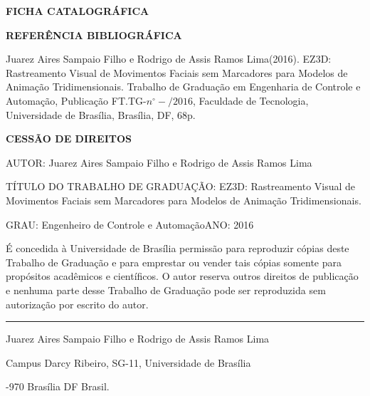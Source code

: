 \noindent \textbf{FICHA CATALOGRÁFICA}

\noindent %

\noindent \medskip{}


\noindent \textbf{REFERÊNCIA BIBLIOGRÁFICA}

Juarez Aires Sampaio Filho e Rodrigo de Assis Ramos Lima(2016). EZ3D: Rastreamento Visual de Movimentos Faciais sem Marcadores para Modelos de Animação Tridimensionais. Trabalho de Graduação
em Engenharia de Controle e Automação, Publicação FT.TG-$n^{\circ}-/2016$,
Faculdade de Tecnologia, Universidade de Brasília, Brasília, DF, 68p.

\noindent \bigskip{}


\noindent \textbf{CESSÃO DE DIREITOS}

\noindent AUTOR: Juarez Aires Sampaio Filho e Rodrigo de Assis Ramos Lima

TÍTULO DO TRABALHO DE GRADUAÇÃO: EZ3D: Rastreamento Visual de Movimentos Faciais sem Marcadores para Modelos de Animação Tridimensionais.

\noindent \medskip{}


\noindent GRAU: Engenheiro de Controle e Automação\hfill{}ANO: 2016\hfill{}

\noindent \medskip{}


É concedida à Universidade de Brasília permissão para reproduzir cópias
deste Trabalho de Graduação e para emprestar ou vender tais cópias
somente para propósitos acadêmicos e científicos. O autor reserva
outros direitos de publicação e nenhuma parte desse Trabalho de Graduação
pode ser reproduzida sem autorização por escrito do autor.

\noindent \bigskip{}


\noindent \rule[0.5ex]{1\columnwidth}{1pt}

\noindent Juarez Aires Sampaio Filho e Rodrigo de Assis Ramos Lima

\noindent Campus Darcy Ribeiro, SG-11, Universidade de Brasília

-970 Brasília \textendash{} DF \textendash{} Brasil.
